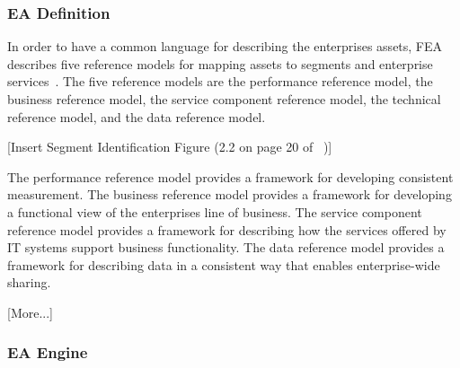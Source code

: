     
\subsubsection{EA Definition}

%
%


In order to have a common language for describing the enterprises assets, FEA describes five reference models for mapping assets to segments and enterprise services~\cite{FederalEnterpriseArchitectureProgramManagementOffice}. The five reference models are the performance reference model, the business reference model, the service component reference model, the technical reference model, and the data reference model. 

[Insert Segment Identification Figure (2.2 on page 20 of ~\cite{FederalEnterpriseArchitectureProgramManagementOffice})]

The performance reference model provides a framework for developing consistent measurement. The business reference model provides a framework for developing a functional view of the enterprises line of business. The service component reference model provides a framework for describing how the services offered by IT systems support business functionality.  The data reference model provides a framework for describing data in a consistent way that enables enterprise-wide sharing. 


[More...]

\subsubsection{EA Engine}

